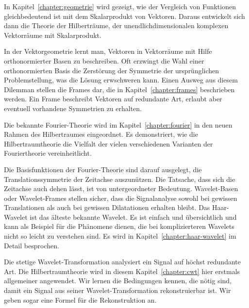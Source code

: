 In Kapitel~\ref{chapter:geometrie} wird gezeigt, wie der Vergleich
von Funktionen gleichbedeutend ist mit dem Skalarprodukt von Vektoren.
Daraus entwickelt sich dann die Theorie der Hilberträume, der
%
unendlichdimensionalen komplexen Vektorräume mit Skalarprodukt.

In der Vektorgeometrie lernt man, Vektoren in Vektorräume mit Hilfe
orthonormierter Basen zu beschreiben.
Oft erzwingt die Wahl einer orthonormierten Basis die Zerstörung
der Symmetrie der ursprünglichen Problemstellung, was die Lösung
erwschweren kann.
Einen Ausweg aus diesem Dilemman stellen die Frames dar, die in
Kapitel~\ref{chapter:frames} beschrieben werden.
%
Ein Frame beschreibt Vektoren auf redundante Art, erlaubt aber eventuell
vorhandene Symmetrien zu erhalten.

Die bekannte Fourier-Theorie wird im Kapitel~\ref{chapter:fourier} in
den neuen Rahmen des Hilbertraumes eingeordnet.
Es demonstriert, wie die Hilbertraumtheorie die Vielfalt der vielen
verschiedenen Varianten der Fouriertheorie vereinheitlicht.

Die Basisfunktionen der Fourier-Theorie sind darauf ausgelegt,
die Translationssymmetrie der Zeitachse auszunützen.
Die Tatsache, dass sich die Zeitachse auch dehen lässt, ist von
untergeordneter Bedeutung.
Wavelet-Basen oder Wavelet-Frames stellen sicher, dass die Signalanalyse
sowohl bei gewissen Translationen als auch bei gewissen Dilatationen
erhalten bleibt.
%
%
Das Haar-Wavelet ist das älteste bekannte Wavelet.
Es ist einfach und übersichtlich und kann als Beispiel für die
Phänomene dienen, die bei komplizierteren Wavelets nicht so leicht
zu verstehen sind.
Es wird in Kapitel~\ref{chapter:haar-wavelet} im Detail besprochen.

Die stetige Wavelet-Transformation analysiert ein Signal auf höchst
%
redundante Art.
Die Hilbert\-raum\-theorie wird in diesem Kapitel~\ref{chapter:cwt} hier
erstmals allgemeiner angewendet.
Wir lernen die Be\-ding\-ungen kennen, die nötig sind, damit ein Signal
aus seiner Wavelet-Transformation rekonstruierbar ist.
Wir geben sogar eine Formel für die Rekonstruktion an.


